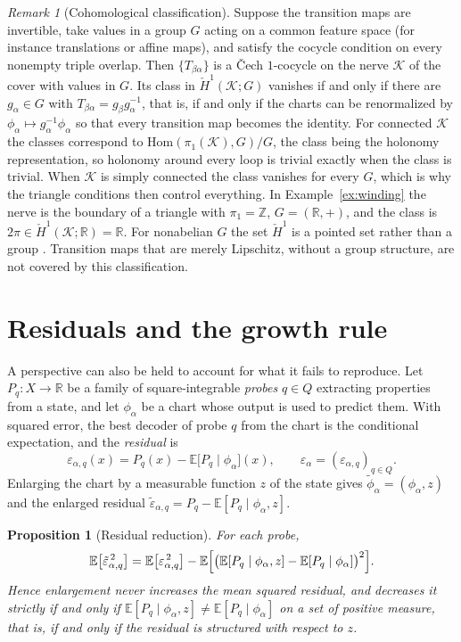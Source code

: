 \documentclass[11pt]{article}
\newtheorem{proposition}{Proposition}
\theoremstyle{remark}
\newtheorem{remark}{Remark}
\newcommand{\R}{\mathbb{R}}
\newcommand{\E}{\mathbb{E}}
\begin{document}
\begin{remark}[Cohomological classification]\label{rem:coh}
Suppose the transition maps are invertible, take values in a group $G$ acting on a common feature space (for instance translations or affine maps), and satisfy the cocycle condition on every nonempty triple overlap. Then $\{T_{\beta\alpha}\}$ is a \v{C}ech $1$-cocycle on the nerve $\mathcal{K}$ of the cover with values in $G$. Its class in $\check H^1(\mathcal K;G)$ vanishes if and only if there are $g_\alpha\in G$ with $T_{\beta\alpha}=g_\beta g_\alpha^{-1}$, that is, if and only if the charts can be renormalized by $\phi_\alpha\mapsto g_\alpha^{-1}\phi_\alpha$ so that every transition map becomes the identity. For connected $\mathcal K$ the classes correspond to $\mathrm{Hom}(\pi_1(\mathcal K),G)/G$, the class being the holonomy representation, so holonomy around every loop is trivial exactly when the class is trivial. When $\mathcal K$ is simply connected the class vanishes for every $G$, which is why the triangle conditions then control everything. In Example~\ref{ex:winding} the nerve is the boundary of a triangle with $\pi_1=\mathbb Z$, $G=(\R,+)$, and the class is $2\pi\in\check H^1(\mathcal K;\R)=\R$. For nonabelian $G$ the set $\check H^1$ is a pointed set rather than a group \cite{bott}. Transition maps that are merely Lipschitz, without a group structure, are not covered by this classification.
\end{remark}

\section{Residuals and the growth rule}

A perspective can also be held to account for what it fails to reproduce. Let $P_q:X\to\R$ be a family of square-integrable \emph{probes} $q\in Q$ extracting properties from a state, and let $\phi_\alpha$ be a chart whose output is used to predict them. With squared error, the best decoder of probe $q$ from the chart is the conditional expectation, and the \emph{residual} is
\[
\varepsilon_{\alpha,q}(x)=P_q(x)-\E\bigl[P_q\mid\phi_\alpha\bigr](x),
\qquad
\varepsilon_\alpha=(\varepsilon_{\alpha,q})_{q\in Q}.
\]
Enlarging the chart by a measurable function $z$ of the state gives $\tilde\phi_\alpha=(\phi_\alpha,z)$ and the enlarged residual $\tilde\varepsilon_{\alpha,q}=P_q-\E[P_q\mid\phi_\alpha,z]$.

\begin{proposition}[Residual reduction]\label{prop:resid}
For each probe,
\[
\E\bigl[\tilde\varepsilon_{\alpha,q}^{\,2}\bigr]
=\E\bigl[\varepsilon_{\alpha,q}^{\,2}\bigr]
-\E\Bigl[\bigl(\E[P_q\mid\phi_\alpha,z]-\E[P_q\mid\phi_\alpha]\bigr)^2\Bigr].
\]
Hence enlargement never increases the mean squared residual, and decreases it strictly if and only if $\E[P_q\mid\phi_\alpha,z]\neq\E[P_q\mid\phi_\alpha]$ on a set of positive measure, that is, if and only if the residual is \emph{structured} with respect to $z$.
\end{proposition}
\end{document}

